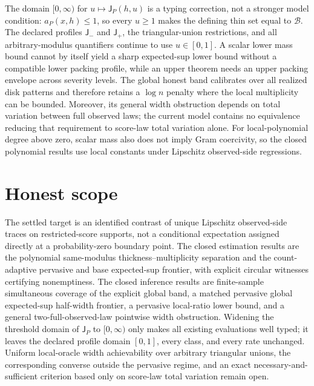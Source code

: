 \documentclass{article}
\begin{document}
The domain \([0,\infty)\) for \(u\mapsto\mathsf J_P(h,u)\) is a typing correction, not a stronger model condition: \(a_P(x,h)\le1\), so every \(u\ge1\) makes the defining thin set equal to \(\mathcal B\). The declared profiles \(\mathsf J_-\) and \(\mathsf J_+\), the triangular-union restrictions, and all arbitrary-modulus quantifiers continue to use \(u\in[0,1]\). A scalar lower mass bound cannot by itself yield a sharp expected-sup lower bound without a compatible lower packing profile, while an upper theorem needs an upper packing envelope across severity levels. The global honest band calibrates over all realized disk patterns and therefore retains a \(\log n\) penalty where the local multiplicity can be bounded. Moreover, its general width obstruction depends on total variation between full observed laws; the current model contains no equivalence reducing that requirement to score-law total variation alone. For local-polynomial degree above zero, scalar mass also does not imply Gram coercivity, so the closed polynomial results use local constants under Lipschitz observed-side regressions.

\section{Honest scope}

The settled target is an identified contrast of unique Lipschitz observed-side traces on restricted-score supports, not a conditional expectation assigned directly at a probability-zero boundary point. The closed estimation results are the polynomial same-modulus thickness--multiplicity separation and the count-adaptive pervasive and base expected-sup frontier, with explicit circular witnesses certifying nonemptiness. The closed inference results are finite-sample simultaneous coverage of the explicit global band, a matched pervasive global expected-sup half-width frontier, a pervasive local-ratio lower bound, and a general two-full-observed-law pointwise width obstruction. Widening the threshold domain of \(\mathsf J_P\) to \([0,\infty)\) only makes all existing evaluations well typed; it leaves the declared profile domain \([0,1]\), every class, and every rate unchanged. Uniform local-oracle width achievability over arbitrary triangular unions, the corresponding converse outside the pervasive regime, and an exact necessary-and-sufficient criterion based only on score-law total variation remain open.
\end{document}
